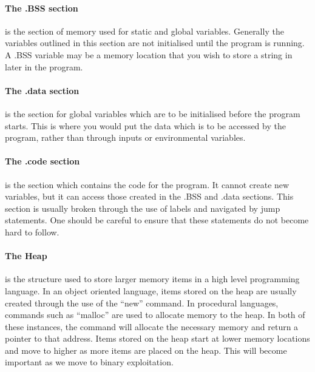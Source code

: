 \documentclass[a4paper,11pt,draft]{article}
\begin{document}
					\paragraph{The .BSS section}
						is the section of memory used for static and global variables. 
						Generally the variables outlined in this section are not initialised until the program is running. 
						A .BSS variable may be a memory location that you wish to store a string in later in the program. 
					\paragraph{The .data section}
						is the section for global variables which are to be initialised before the program starts. 
						This is where you would put the data which is to be accessed by the program, rather than through inputs or environmental variables. 
					\paragraph{The .code section}
						is the section which contains the code for the program. 
						It cannot create new variables, but it can access those created in the .BSS and .data sections. 
						This section is usually broken through the use of labels and navigated by jump statements. 
						One should be careful to ensure that these statements do not become hard to follow. 
					\paragraph{The Heap}
						is the structure used to store larger memory items in a high level programming language. 
						In an object oriented language, items stored on the heap are usually created through the use of the ``new'' command. 
						In procedural languages, commands such as ``malloc'' are used to allocate memory to the heap. 
						In both of these instances, the command will allocate the necessary memory and return a pointer to that address. 
						Items stored on the heap start at lower memory locations and move to higher as more items are placed on the heap. 
						This will become important as we move to binary exploitation. 
\end{document}
